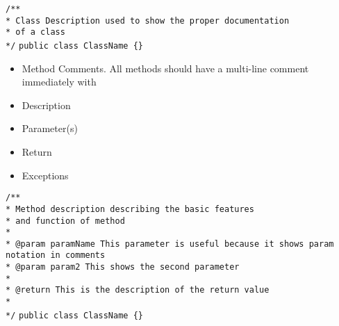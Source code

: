 \documentclass{scrreprt}
\begin{document}
\texttt{/** \\}
\texttt{* Class Description used to show the proper documentation \\}
\texttt{* of a class \\}
\texttt{*/}
\texttt{public class ClassName \{\}}

\begin{itemize}
\item Method Comments. All methods should have a multi-line comment immediately with
\item Description
\item Parameter(s)
\item Return
\item Exceptions
\end{itemize}

\texttt{/** \\}
\texttt{* Method description describing the basic features \\}
\texttt{* and function of method\\}
\texttt{* \\}
\texttt{* @param paramName This parameter is useful because it shows param notation in comments \\}
\texttt{* @param param2 This shows the second parameter \\}
\texttt{* \\}
\texttt{* @return This is the description of the return value\\}
\texttt{* \\}
\texttt{*/}
\texttt{public class ClassName \{\}}
\end{document}
